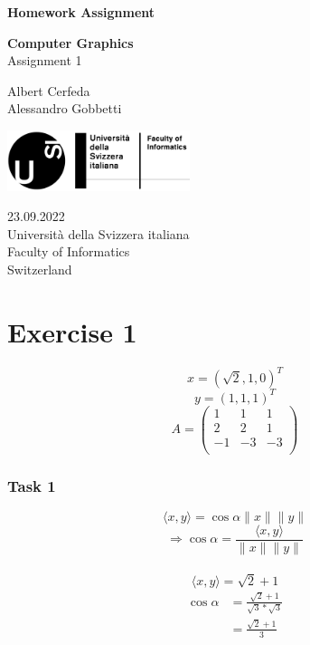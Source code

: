 \documentclass[tikz,14pt,fleqn]{article}
\newcommand\namesurname{Albert Cerfeda\\Alessandro Gobbetti}
\newcommand\assignment{Assignment 1}
\newcommand\subject{Computer Graphics}
\newcommand\documentdate{23.09.2022}
\begin{document}
\begin{titlepage}
   \begin{center}
       \vspace*{1cm}

       \textbf{\Large{Homework Assignment}}

       \vspace{0.5cm}
        \textbf{\subject}\\[5mm]
       \assignment
        
            
       \vspace{1.8cm}

        \namesurname
       \tableofcontents

       \vspace*{\fill}
     
       \includegraphics[width=0.4\textwidth]{logo.png}
       
        \documentdate \\
        Università della Svizzera italiana\\
        Faculty of Informatics\\
        Switzerland\\

   \end{center}
\end{titlepage}


\section{Exercise 1}
\[
x = (\sqrt{2}, 1, 0)^T
\]
\[ y = (1,1,1)^T\]
\[
A =
\begin{pmatrix}
1 & 1 & 1 \\
2 & 2 & 1 \\
-1 & -3 & -3 \\
\end{pmatrix}
\]
\subsubsection*{Task 1}
\[
\langle x,y \rangle = \cos\alpha\| x\|\| y \|
\]
\[
\Rightarrow \cos\alpha = \frac{\langle x,y \rangle}{\| x\|\| y \|}
\]\\
\[
\langle x,y \rangle = \sqrt{2}+1
\]
\begin{align*}
    \cos\alpha &= \frac{\sqrt{2}+1}{\sqrt{3}*\sqrt{3}}\\
    &= \frac{\sqrt{2} +1}{3}
\end{align*}
\[
\]
\end{document}
